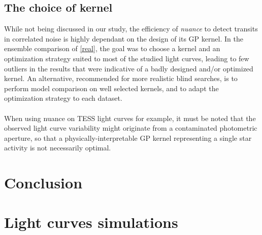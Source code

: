 \documentclass{aastex631}
\newcommand{\nuancemethod}{\textit{nuance}}
\newcommand{\nuancecode}{\textsf{nuance}}
\begin{document}
\subsection{The choice of kernel}
While not being discussed in our study, the efficiency of \nuancemethod{} to detect transits in correlated noise is highly dependant on the design of its GP kernel. In the ensemble comparison of \autoref{real}, the goal was to choose a kernel and an optimization strategy suited to most of the studied light curves, leading to few outliers in the results that were indicative of a badly designed and/or optimized kernel. An alternative, recommended for more realistic blind searches, is to perform model comparison on well selected kernels, and to adapt the optimization strategy to each dataset.\\\\
When using \nuancecode{} on TESS light curves for example, it must be noted that the observed light curve variability might originate from a contaminated photometric aperture, so that a physically-interpretable GP kernel representing a single star activity is not necessarily optimal.

\section{Conclusion}




\newpage
\appendix
\section{Light curves simulations}\label{signals_simulations}
\end{document}

